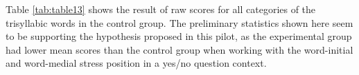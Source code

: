 \documentclass[a4paper]{article}
\begin{document}
%
%     
%
Table \ref{tab:table13} shows the result of raw scores for all categories of the trisyllabic words in the control group. The preliminary statistics shown here seem to be supporting the hypothesis proposed in this pilot, as the experimental group had lower mean scores than the control group when working with the word-initial and word-medial stress position in a yes/no question context.
\end{document}
